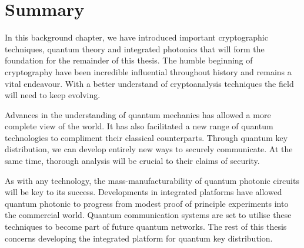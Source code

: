 
\section{Summary}

In this background chapter, we have introduced important cryptographic techniques, quantum theory and integrated photonics that will form the foundation for the remainder of this thesis. The humble beginning of cryptography have been incredible influential throughout history and remains a vital endeavour. With a better understand of cryptoanalysis techniques the field will need to keep evolving.

Advances in the understanding of quantum mechanics has allowed a more complete view of the world. It has also facilitated a new range of quantum technologies to compliment their classical counterparts. Through quantum key distribution, we can develop entirely new ways to securely communicate. At the same time, thorough analysis will be crucial to their claims of security.

As with any technology, the mass-manufacturability of quantum photonic circuits will be key to its success. Developments in integrated platforms have allowed quantum photonic to progress from modest proof of principle experiments into the commercial world. Quantum communication systems are set to utilise these techniques to become part of future quantum networks. The rest of this thesis concerns developing the integrated platform for quantum key distribution.

